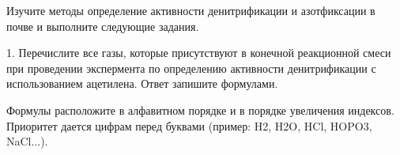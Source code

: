 
Изучите методы определение активности денитрификации и азотфиксации в почве и выполните следующие задания.

1. Перечислите все газы, которые присутствуют в конечной реакционной смеси при проведении экспермента по определению активности денитрификации с использованием ацетилена. Ответ запишите формулами.

Формулы расположите в алфавитном порядке и в порядке увеличения индексов. Приоритет дается цифрам перед буквами (пример: H2, H2O, HCl, HOPO3, NaCl...).